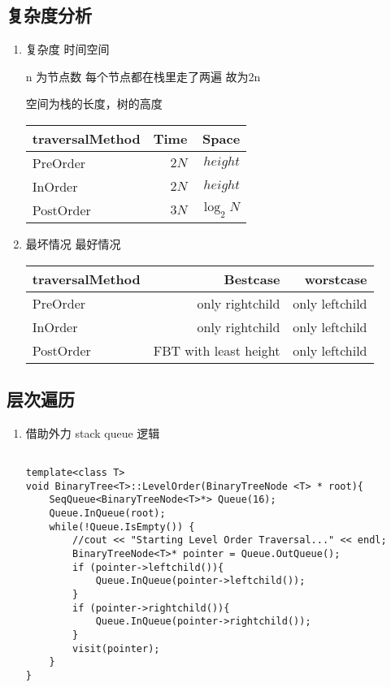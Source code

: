 \documentclass[UTF8]{ctexart}
\begin{document}
\subsection*{复杂度分析}
\begin{enumerate}
    \item   复杂度 时间空间
    
    n 为节点数 每个节点都在栈里走了两遍 故为2n

    空间为栈的长度，树的高度

    \begin{tabular}{|l|r|r|} \hline
        traversalMethod & Time & Space \\\hline
        PreOrder & $2N$ & $height$ \\
        InOrder & $2N$ & $height$ \\
        PostOrder & $3N$ & $\log _2 N$ \\\hline
    \end{tabular}
    

    \item   最坏情况 最好情况 %
    

    \begin{tabular}{|l|r|r|} \hline   
    traversalMethod & Bestcase & worstcase \\\hline
        PreOrder & only rightchild & only leftchild \\
        InOrder & only rightchild & only leftchild \\
        PostOrder & FBT with least height & only leftchild \\\hline
    \end{tabular}
\end{enumerate}

\subsection*{层次遍历}
\begin{enumerate}
    \item   借助外力 stack queue 逻辑
    \begin{lstlisting}[style=cppstyle]
        
template<class T>
void BinaryTree<T>::LevelOrder(BinaryTreeNode <T> * root){
    SeqQueue<BinaryTreeNode<T>*> Queue(16);
    Queue.InQueue(root);
    while(!Queue.IsEmpty()) {
        //cout << "Starting Level Order Traversal..." << endl;
        BinaryTreeNode<T>* pointer = Queue.OutQueue();
        if (pointer->leftchild()){
            Queue.InQueue(pointer->leftchild());
        }
        if (pointer->rightchild()){
            Queue.InQueue(pointer->rightchild());
        }
        visit(pointer);
    }
}

    \end{lstlisting}
\end{enumerate}
\end{document}
